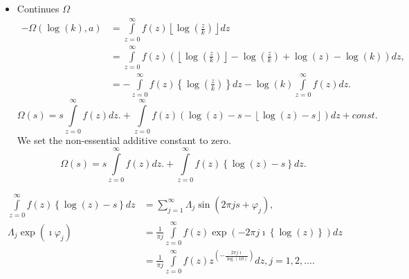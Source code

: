 \documentclass[titlepage,fleqn]{article}%
\begin{document}
\begin{itemize}
\item Continues $\Omega$%
\begin{align*}
-\Omega(\log(k),a)  &  =%
{\displaystyle\int\limits_{z=0}^{\infty}}
f(z)\left\lfloor \log\left(  \frac{z}{k}\right)  \right\rfloor dz\\
&  =%
{\displaystyle\int\limits_{z=0}^{\infty}}
f(z)\left(  \left\lfloor \log\left(  \frac{z}{k}\right)  \right\rfloor
-\log\left(  \frac{z}{k}\right)  +\log\left(  z\right)  -\log\left(  k\right)
\right)  dz,\\
&  =-%
{\displaystyle\int\limits_{z=0}^{\infty}}
f(z)\left\{  \log\left(  \frac{z}{k}\right)  \right\}  dz-\log\left(
k\right)
{\displaystyle\int\limits_{z=0}^{\infty}}
f(z)dz.
\end{align*}%
\[
\Omega(s)=s%
{\displaystyle\int\limits_{z=0}^{\infty}}
f(z)dz.+%
{\displaystyle\int\limits_{z=0}^{\infty}}
f(z)\left(  \log\left(  z\right)  -s-\left\lfloor \log\left(  z\right)
-s\right\rfloor \right)  dz+const.
\]
We set the non-essential additive constant to zero.%
\[
\Omega(s)=s%
{\displaystyle\int\limits_{z=0}^{\infty}}
f(z)dz.+%
{\displaystyle\int\limits_{z=0}^{\infty}}
f(z)\left\{  \log\left(  z\right)  -s\right\}  dz.
\]

\end{itemize}

%

\begin{align*}%
{\displaystyle\int\limits_{z=0}^{\infty}}
f(z)\left\{  \log\left(  z\right)  -s\right\}  dz  &  =%
{\displaystyle\sum\limits_{j=1}^{\infty}}
\Lambda_{j}\sin(2\pi js+\varphi_{j}),\\
\Lambda_{j}\exp(\imath\varphi_{j})  &  =\frac{1}{\pi j}%
{\displaystyle\int\limits_{z=0}^{\infty}}
f(z)\exp(-2\pi j\imath\left\{  \log\left(  z\right)  \right\}  )dz\\
&  =\frac{1}{\pi j}%
{\displaystyle\int\limits_{z=0}^{\infty}}
f(z)z^{\left(  -\frac{2\pi j\imath}{\log\left(  10\right)  }\right)
}dz,j=1,2,\ldots.
\end{align*}
\end{document}
